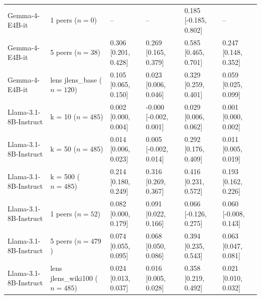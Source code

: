 \begin{tabular}{llllll}
Gemma-4-E4B-it & 1 peers ($n{=}0$) & -- & -- & 0.185 [-0.185, 0.802] & -- \\
Gemma-4-E4B-it & 5 peers ($n{=}38$) & 0.306 [0.201, 0.428] & 0.269 [0.165, 0.379] & 0.585 [0.465, 0.701] & 0.247 [0.148, 0.352] \\
Gemma-4-E4B-it & lens jlens\_base ($n{=}120$) & 0.105 [0.065, 0.150] & 0.023 [0.006, 0.046] & 0.329 [0.259, 0.401] & 0.059 [0.025, 0.099] \\
\midrule
Llama-3.1-8B-Instruct & k = 10 ($n{=}485$) & 0.002 [0.000, 0.004] & -0.000 [-0.002, 0.001] & 0.029 [0.006, 0.062] & 0.001 [0.000, 0.002] \\
Llama-3.1-8B-Instruct & k = 50 ($n{=}485$) & 0.014 [0.006, 0.023] & 0.005 [-0.002, 0.014] & 0.292 [0.176, 0.409] & 0.011 [0.005, 0.019] \\
Llama-3.1-8B-Instruct & k = 500 ($n{=}485$) & 0.214 [0.180, 0.249] & 0.316 [0.269, 0.367] & 0.416 [0.231, 0.572] & 0.193 [0.162, 0.226] \\
Llama-3.1-8B-Instruct & 1 peers ($n{=}52$) & 0.082 [0.000, 0.179] & 0.091 [0.022, 0.166] & 0.066 [-0.126, 0.275] & 0.060 [-0.008, 0.143] \\
Llama-3.1-8B-Instruct & 5 peers ($n{=}479$) & 0.074 [0.055, 0.095] & 0.068 [0.050, 0.086] & 0.394 [0.235, 0.543] & 0.063 [0.047, 0.081] \\
Llama-3.1-8B-Instruct & lens jlens\_wiki100 ($n{=}485$) & 0.024 [0.013, 0.037] & 0.016 [0.005, 0.028] & 0.358 [0.219, 0.492] & 0.021 [0.010, 0.032] \\
\bottomrule
\end{tabular}
